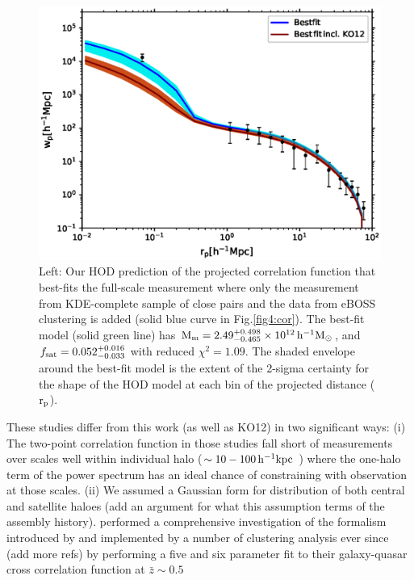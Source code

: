 \documentclass[useAMS,usenatbib]{mn2e}
\begin{document}
\begin{figure}
    \centering
       \includegraphics[angle=0,scale=0.6]{Bestfit_with_wp10c_2pars_1KDE_NOKO12.eps}
    \caption{Left: Our HOD prediction of the projected correlation function that 
best-fits the full-scale measurement where only the measurement from 
KDE-complete sample of close pairs and the data from eBOSS clustering is added 
(solid blue curve in Fig.\ref{fig4:cor}). The best-fit model (solid green line) 
has $\rm M_{m} = 2.49_{-0.465}^{+0.498} \times 10^{12}\, h^{-1} M_{\odot}$, and 
$f_{\rm sat} = 0.052_{-0.033}^{+0.016}$ with reduced $\chi^{2} = 1.09$. The 
shaded envelope around the best-fit model is the extent of the 2-sigma certainty 
for the shape of the HOD model at each bin of the projected distance ($\rm 
r_p$). }\label{fig6:kdeboss}
\end{figure}



 These studies differ from this work (as well as KO12) in two 
significant ways: (i) The two-point correlation function in those studies fall 
short of measurements over scales well within individual halo ($\sim 10-100 \, 
\rm h^{-1} kpc$ ) where the one-halo term of the power spectrum has an ideal 
chance of constraining with observation at those scales. (ii) We assumed a 
Gaussian form for distribution of both central and satellite haloes (add an 
argument for what this assumption terms of the assembly history). \citet{sh13} 
performed a comprehensive investigation of the formalism introduced by 
\citet{zh05} and implemented by a number of clustering analysis ever since 
\citep{zh07,mi11,zeh11,ric12,ric13}(add more refs) by performing a five and six 
parameter fit to their galaxy-quasar cross correlation function at $\bar z \sim 
0.5$  
 
\end{document}

